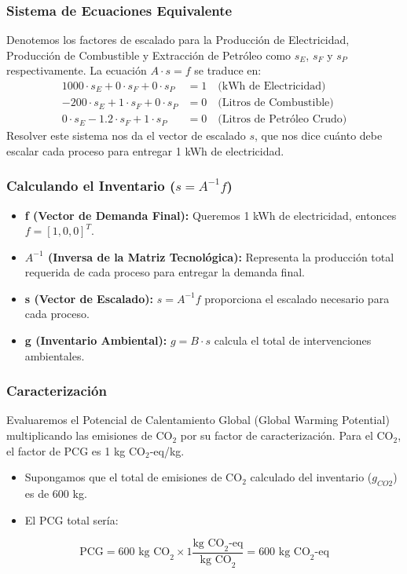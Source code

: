 \documentclass{beamer}
\begin{document}
\begin{frame}
  \frametitle{Sistema de Ecuaciones Equivalente}
  Denotemos los factores de escalado para la Producción de Electricidad, Producción de Combustible y Extracción de Petróleo como $s_E$, $s_F$ y $s_P$ respectivamente. La ecuación $A \cdot s = f$ se traduce en:
  \begin{align*}
    1000 \cdot s_E + 0 \cdot s_F + 0 \cdot s_P &= 1 \quad \text{(kWh de Electricidad)} \\
    -200 \cdot s_E + 1 \cdot s_F + 0 \cdot s_P &= 0 \quad \text{(Litros de Combustible)} \\
    0 \cdot s_E - 1.2 \cdot s_F + 1 \cdot s_P &= 0 \quad \text{(Litros de Petróleo Crudo)}
  \end{align*}
  Resolver este sistema nos da el vector de escalado $s$, que nos dice cuánto debe escalar cada proceso para entregar 1 kWh de electricidad.
\end{frame}

\begin{frame}
  \frametitle{Calculando el Inventario ($s = A^{-1}f$)}
  \begin{itemize}
    \item \textbf{f (Vector de Demanda Final):} Queremos 1 kWh de electricidad, entonces $f = [1, 0, 0]^T$.
    \item \textbf{$A^{-1}$ (Inversa de la Matriz Tecnológica):} Representa la producción total requerida de cada proceso para entregar la demanda final.
    \item \textbf{s (Vector de Escalado):} $s = A^{-1}f$ proporciona el escalado necesario para cada proceso.
    \item \textbf{g (Inventario Ambiental):} $g = B \cdot s$ calcula el total de intervenciones ambientales.
  \end{itemize}
\end{frame}

\begin{frame}
  \frametitle{Caracterización}
  Evaluaremos el Potencial de Calentamiento Global (Global Warming Potential) multiplicando las emisiones de CO$_2$ por su factor de caracterización. Para el CO$_2$, el factor de PCG es 1 kg CO$_2$-eq/kg.
  \begin{itemize}
    \item Supongamos que el total de emisiones de CO$_2$ calculado del inventario ($g_{CO2}$) es de 600 kg.
    \item El PCG total sería:
  \end{itemize}
  \begin{equation*}
    \text{PCG} = 600 \text{ kg CO}_2 \times 1 \frac{\text{kg CO}_2\text{-eq}}{\text{kg CO}_2} = 600 \text{ kg CO}_2\text{-eq}
  \end{equation*}
\end{frame}
\end{document}
